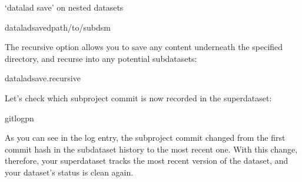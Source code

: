 \begin{findoutmore}[label={fom-save-subds}, before title={\thetcbcounter\ }, float, floatplacement=tb, check odd page=true]{‘datalad save’ on nested datasets}
\begin{sphinxVerbatim}[commandchars=\\\{\}]
dataladsave\PYGZhy{}dpath/to/subds\PYGZhy{}m
\end{sphinxVerbatim}

\sphinxAtStartPar
The recursive option allows you to save any content underneath the specified
directory, and recurse into any potential subdatasets:

\begin{sphinxVerbatim}[commandchars=\\\{\}]
dataladsave.\PYGZhy{}\PYGZhy{}recursive
\end{sphinxVerbatim}


\end{findoutmore}

\sphinxAtStartPar
Let’s check which subproject commit is now recorded in the superdataset:

%
\begin{sphinxVerbatim}[commandchars=\\\{\}]
gitlog\PYGZhy{}p\PYGZhy{}n


\end{sphinxVerbatim}
\sphinxresetverbatimhllines

\sphinxAtStartPar
As you can see in the log entry, the subproject commit changed from the
first commit hash in the subdataset history to the most recent one. With this
change, therefore, your superdataset tracks the most recent version of
the  dataset, and your dataset’s status is clean again.

